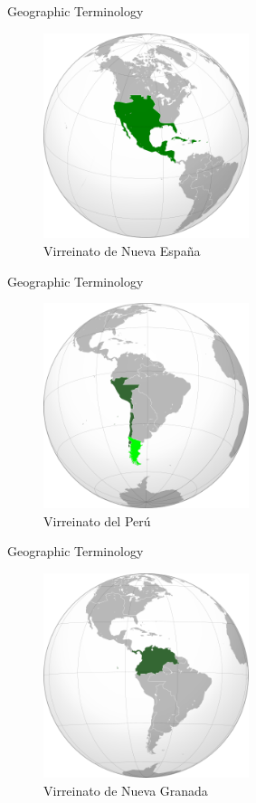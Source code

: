 \documentclass{beamer}
\begin{document}
\begin{frame}{Geographic Terminology}
\begin{figure}
\includegraphics[width=6cm]{figures/vice_nuevaespana.png}
\caption{Virreinato de Nueva Espa\~{n}a}
\end{figure}
\end{frame}

\begin{frame}{Geographic Terminology}
\begin{figure}
\includegraphics[width=6cm]{figures/vice_peru.png}
\caption{Virreinato del Per\'{u}}
\end{figure}
\end{frame}

\begin{frame}{Geographic Terminology}
\begin{figure}
\includegraphics[width=6cm]{figures/vice_nuevagranada.png}
\caption{Virreinato de Nueva Granada}
\end{figure}
\end{frame}
\end{document}
